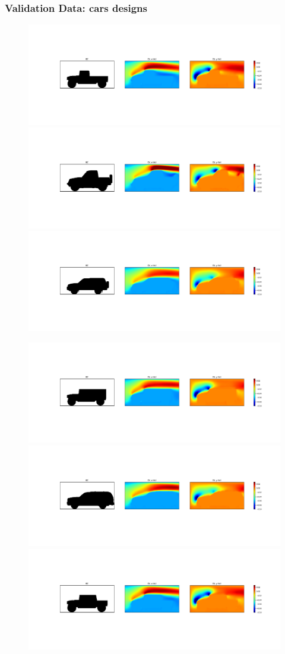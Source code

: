 \documentclass{beamer}
\begin{document}
\begin{frame}
\frametitle{Validation Data: cars designs}
\begin{figure}[h]
\vspace{0.4cm}
\includegraphics[height=0.16\linewidth, trim = 5.80cm 7.35cm 33.4cm 7.2cm, clip]{../../../plots/plots/cars/comparison/montage_car_DL_01.png}%
\includegraphics[height=0.16\linewidth, trim = 5.80cm 7.35cm 33.4cm 7.2cm, clip]{../../../plots/plots/cars/comparison/montage_car_DL_27.png}%
\includegraphics[height=0.16\linewidth, trim = 5.80cm 7.35cm 33.4cm 7.2cm, clip]{../../../plots/plots/cars/comparison/montage_car_DL_00.png}%

\includegraphics[height=0.16\linewidth, trim = 5.80cm 7.35cm 33.4cm 7.2cm, clip]{../../../plots/plots/cars/comparison/montage_car_DL_02.png}%
\includegraphics[height=0.16\linewidth, trim = 5.80cm 7.35cm 33.4cm 7.2cm, clip]{../../../plots/plots/cars/comparison/montage_car_DL_03.png}%
\includegraphics[height=0.16\linewidth, trim = 5.80cm 7.35cm 33.4cm 7.2cm, clip]{../../../plots/plots/cars/comparison/montage_car_DL_04.png}%


\end{figure}
\end{frame}
\end{document}
